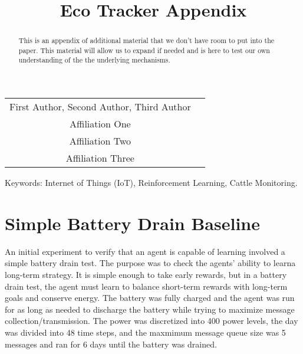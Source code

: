 \documentclass[10pt]{cai}
\begin{document}
\def\conferenceyear{2025}
\begin{center}

\title{Eco Tracker Appendix}
\maketitle

\thispagestyle{empty}

\begin{tabular}{cc}
First Author\upstairs{\affilone,*}, Second Author\upstairs{\affilone}, Third Author\upstairs{\affilthree}
\\[0.25ex]
{\small \upstairs{\affilone} Affiliation One} \\
{\small \upstairs{\affiltwo} Affiliation Two} \\
{\small \upstairs{\affilthree} Affiliation Three} \\
\end{tabular}
  
\vspace*{0.2in}
\end{center}

\begin{abstract}
This is an appendix of additional material that we don't have room to put into the paper.
This material will allow us to expand if needed and is here to test our own understanding of the the underlying mechanisms.


\end{abstract}

\begin{keywords}{Keywords:}
Internet of Things (IoT), Reinforcement Learning, Cattle Monitoring.
\end{keywords}
\copyrightnotice

\section{Simple Battery Drain Baseline}
An initial experiment to verify that an agent is capable of learning involved a simple battery drain test.
The purpose was to check the agents' ability to learna long-term strategy.
It is simple enough to take early rewards, but in a battery drain test, the agent must learn to balance short-term rewards with long-term goals and conserve energy.
The battery was fully charged and the agent was run for as long as needed to discharge the battery while trying to maximize message collection/transmission.
The power was discretized into 400 power levels, the day was divided into 48 time steps, and the maxmimum message queue size was 5 messages and ran for 6 days until the battery was drained.
\end{document}
